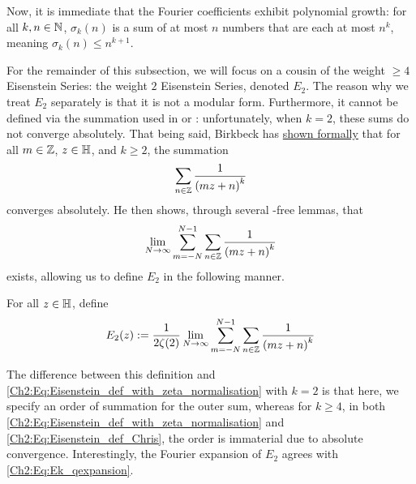 Now, it is immediate that the Fourier coefficients exhibit polynomial growth: for all $k, n \in \mathbb{N}$, $\sigma_k(n)$ is a sum of at most $n$ numbers that are each at most $n^k$, meaning $\sigma_k(n) \leq n^{k+1}$.


For the remainder of this subsection, we will focus on a cousin of the weight $\geq 4$ Eisenstein Series: the weight $2$ Eisenstein Series, denoted $E_2$. The reason why we treat $E_2$ separately is that it is not a modular form. Furthermore, it cannot be defined via the summation used in  or : unfortunately, when $k = 2$, these sums do not converge absolutely. That being said, Birkbeck has \href{https://github.com/thefundamentaltheor3m/Sphere-Packing-Lean/blob/076f4b8d6a37fa95de3bc4764a5d7f911fde91e0/SpherePacking/ModularForms/summable_lems.lean#L1680}{shown formally} that for all $m \in \mathbb{Z}$, $z \in \mathbb{H}$, and $k \geq 2$, the summation
\begin{align*}
    \sum_{n \in \mathbb{Z}} \frac{1}{\left( mz + n \right)^k}
\end{align*}
converges absolutely. He then shows, through several \sorry-free lemmas, that
\begin{align*}
    \lim_{N \to \infty} \sum_{m = -N}^{N - 1} \sum_{n \in \mathbb{Z}} \frac{1}{\left( mz + n \right)^k}
\end{align*}
exists, allowing us to define $E_2$ in the following manner.

\begin{boxdefinition}[$E_2$]
    For all $z \in \mathbb{H}$, define
    \begin{align*}
        E_2(z) := \frac{1}{2\zeta(2)} \lim_{N \to \infty} \sum_{m = -N}^{N - 1} \sum_{n \in \mathbb{Z}} \frac{1}{\left( mz + n \right)^k}
    \end{align*}
\end{boxdefinition}

The difference between this definition and \eqref{Ch2:Eq:Eisenstein_def_with_zeta_normalisation} with $k = 2$ is that here, we specify an order of summation for the outer sum, whereas for $k \geq 4$, in both \eqref{Ch2:Eq:Eisenstein_def_with_zeta_normalisation} and \eqref{Ch2:Eq:Eisenstein_def_Chris}, the order is immaterial due to absolute convergence. Interestingly, the Fourier expansion of $E_2$ agrees with \eqref{Ch2:Eq:Ek_qexpansion}.

